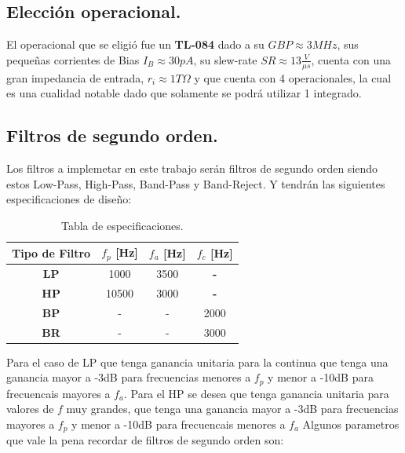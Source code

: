 \documentclass[a4paper]{article}
\begin{document}
\subsection{Elección operacional.}
El operacional que se eligió fue un \textbf{TL-084} dado a su $GBP \approx 3MHz$, sus pequeñas corrientes de Bias $I_B \approx 30pA$, su slew-rate $SR \approx 13 \frac{V}{\mu s}$, cuenta con una gran impedancia de entrada, $ r_i \approx 1T \Omega $ y que cuenta con 4 operacionales, la cual es una cualidad notable dado que solamente se podrá utilizar 1 integrado.

 \flushleft
\subsection{Filtros de segundo orden.}
Los filtros a implemetar en este trabajo serán filtros de segundo orden siendo estos Low-Pass, High-Pass, Band-Pass y Band-Reject. Y tendrán las siguientes especificaciones de diseño:
\begin{table}[H]
\begin{center}
\begin{tabular}{|c|c|c|c|}
\hline
\textbf{Tipo de Filtro} & \textbf{$f_p$ [Hz]} & \textbf{$f_a$ [Hz]} & \textbf{$f_c$ [Hz]} \\ \hline
\textbf{LP}             & 1000                & 3500                & \textbf{-}          \\ \hline
\textbf{HP}             & 10500               & 3000                & \textbf{-}          \\ \hline
\textbf{BP}             & -                   & -                   & 2000                \\ \hline
\textbf{BR}             & -                   & -                   & 3000                \\ \hline
\end{tabular}
\caption{Tabla de especificaciones.}
\label{tab:specs}
\end{center}
\end{table}
Para el caso de LP que tenga ganancia unitaria para la continua que tenga una ganancia mayor a -3dB para frecuencias menores a $f_p$ y menor a -10dB para frecuencais mayores a $f_a$. Para el HP se desea que tenga ganancia unitaria para valores de $f$ muy grandes, que tenga una ganancia mayor a -3dB para frecuencias mayores a $f_p$ y menor a -10dB para frecuencais menores a $f_a$
Algunos parametros que vale la pena recordar de filtros de segundo orden son:
\end{document}
